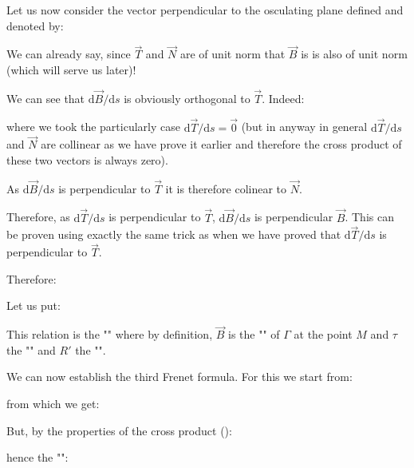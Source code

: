 {	Let us now consider the vector perpendicular to the osculating plane defined and denoted by:
	
	We can already say, since $\vec{T}$ and $\vec{N}$ are of unit norm that $\vec{B}$ is is also of unit norm (which will serve us later)!
	
	We can see that $\mathrm{d}\vec{B}/\mathrm{d}s$ is obviously orthogonal to $\vec{T}$. Indeed:
	
	where we took the particularly case $\mathrm{d}\vec{T}/\mathrm{d}s=\vec{0}$  (but in anyway in general $\mathrm{d}\vec{T}/\mathrm{d}s$ and $\vec{N}$ are collinear as we have prove it earlier and therefore the cross product of these two vectors is always zero).
	
	As $\mathrm{d}\vec{B}/\mathrm{d}s$ is perpendicular to $\vec{T}$ it is therefore colinear to $\vec{N}$.
	
	Therefore, as $\mathrm{d}\vec{T}/\mathrm{d}s$ is perpendicular to $\vec{T}$, $\mathrm{d}\vec{B}/\mathrm{d}s$ is perpendicular $\vec{B}$. This can be proven using exactly the same trick as when we have proved that $\mathrm{d}\vec{T}/\mathrm{d}s$ is perpendicular to $\vec{T}$.
	
	Therefore:
	
	
	Let us put:
	
	This relation is the "" where by definition, $\vec{B}$ is the "" of $\Gamma$ at the point $M$ and $\tau$ the "" and $R'$ the "".
	
	We can now establish the third Frenet formula. For this we start from:
	
	from which we get:
	
	But, by the properties of the cross product ():
	
	hence the "":
	
}
